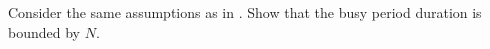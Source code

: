\begin{problem}
Consider the same assumptions as in . Show
that the busy period duration is bounded by $N$.
\end{problem}

